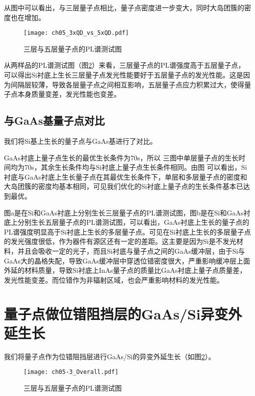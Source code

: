 从图中可以看出，与三层量子点相比，量子点密度进一步变大，同时大岛团簇的密度也在增加。

\begin{figure}[ht]
	\centering
	\texttt{[image: ch05\_3xQD\_vs\_5xQD.pdf]}
	\caption{三层与五层量子点的PL谱测试图}
	\label{fig:3xQD_vs_5xQD}
\end{figure}

从两样品的PL谱测试图（图\ref{fig:3xQD_vs_5xQD}）来看，三层量子点的PL谱强度高于五层量子点，可以得出Si衬底上生长三层量子点发光性能要好于五层量子点的发光性能。这是因为间隔层较薄，导致各层量子点之间相互影响，五层量子点应力积累过大，使得量子点本身质量变差，发光性能也变差。



\subsection{与GaAs基量子点对比}

我们将Si基上生长的量子点与GaAs基进行了对比。

GaAs衬底上量子点生长的最优生长条件为70s，所以     三图中单层量子点的生长时间均为70s，其余生长条件均与Si衬底上量子点生长条件相同。由图   可以看出，Si衬底与GaAs衬底上生长量子点在其最优生长条件下，单层和多层量子点的密度和大岛团簇的密度均基本相同，可见我们优化的Si衬底上量子点的生长条件基本已达到最优。

图a是在Si和GaAs衬底上分别生长三层量子点的PL谱测试图，图b是在Si和GaAs衬底上分别生长五层量子点的PL谱测试图，可以看出，GaAs衬底上生长的量子点的PL谱强度明显高于Si衬底上生长的多层量子点。可见在Si衬底上生长的多层量子点的发光强度很低，作为器件有源区还有一定的差距。这主要是因为Si是不发光材料，并且会吸收一定的光子，而且Si衬底与量子点之间的GaAs缓冲层，由于Si与GaAs大的晶格失配，导致GaAs缓冲层中穿透位错密度很大，严重影响缓冲层上面外延的材料质量，导致Si衬底上InAs量子点的质量比GaAs衬底上量子点质量差，发光性能变差。而位错作为非辐射区域，也会严重影响材料的发光性能。

\section{量子点做位错阻挡层的GaAs/Si异变外延生长}

我们将量子点作为位错阻挡层进行GaAs/Si的异变外延生长（如图\ref{fig:3xQD_vs_5xQD}）。

\begin{figure}[ht]
	\centering
	\texttt{[image: ch05-3\_Overall.pdf]}
	\caption{三层与五层量子点的PL谱测试图}
	\label{fig:3xQD_vs_5xQD}
\end{figure}

